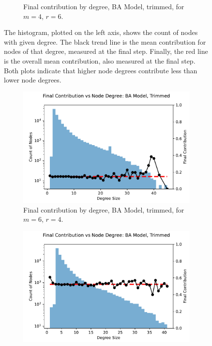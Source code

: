 \begin{figure}[!h]
\begin{subfigure}[b]{0.45\textwidth}
    \caption{Final contribution by degree, BA Model, trimmed, for $m=4$, $r=6$. }
    \label{ID_by_degree_m_4_phi_6}
  \end{subfigure}
  \caption{The histogram, plotted on the left axis, shows the count of nodes with given degree. The black trend line is the mean contribution for nodes of that degree, measured at the final step. Finally, the red line is the overall mean contribution, also measured at the final step. Both plots indicate that higher node degrees contribute less than lower node degrees.} \label{ID_by_degree_m_4}
\end{figure} 
\FloatBarrier


\FloatBarrier 
\begin{figure}[!h]
  \begin{subfigure}[b]{0.45\textwidth}
    \includegraphics[width=1.1\textwidth]{images/ID_BA_node_groups_m_6_phi_4_trimmed.pdf}
    \caption{Final contribution by degree, BA Model, trimmed, for $m=6$, $r=4$.   }
    \label{ID_by_degree_m_6_phi_4}
  \end{subfigure}
  \hfill
  \begin{subfigure}[b]{0.45\textwidth}
    \includegraphics[width=1.1\textwidth]{images/ID_BA_node_groups_m_6_phi_6_trimmed.pdf}

\end{subfigure}
\end{figure}
